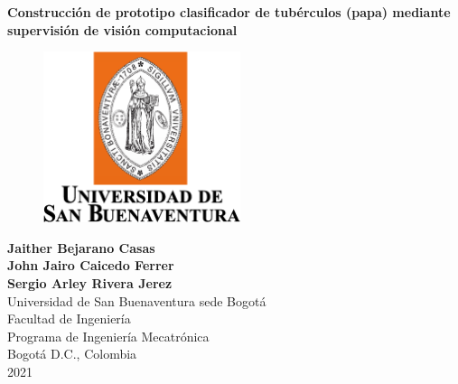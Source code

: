 \cleardoublepage

\thispagestyle{empty} 
\begin{center}
\textbf{ 
\huge{Construcción de prototipo clasificador de tubérculos (papa) mediante supervisión de visión computacional}}\\[1.0cm]


\begin{figure}[htbp]
	\centering
		\includegraphics[height=5cm,keepaspectratio]{OtrosTex/LogoUSB}
\end{figure}

\vspace*{2cm} 
\Large\textbf{Jaither Bejarano Casas \\ John Jairo Caicedo Ferrer \\Sergio Arley Rivera Jerez}\\[1.0cm]

\vspace*{2cm} 
\Large{Universidad de San Buenaventura sede Bogotá}\\
\Large{Facultad de Ingeniería}\\
\Large{Programa de Ingeniería Mecatrónica}\\
\large{Bogotá D.C., Colombia\\
2021}\\
\end{center}

\newpage{\pagestyle{empty}\cleardoublepage}
\newpage
%
